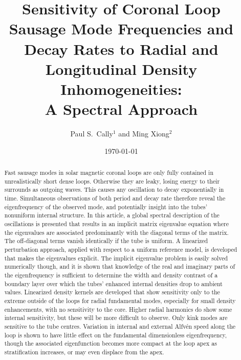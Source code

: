 \documentclass[12pt]{iopart}
\begin{document}

\title[Sensitivity of Coronal Loop Sausage Mode Frequencies]{Sensitivity of Coronal Loop Sausage Mode Frequencies and Decay Rates to Radial and Longitudinal Density Inhomogeneities:\\ A Spectral Approach}

\date{\today}


\author{Paul S.~Cally$^1$ and Ming Xiong$^2$}
\address{$^1$School of Mathematical Sciences and Monash Centre for Astrophysics,\\ Monash University, Clayton, Victoria 3800, Australia}
\address{$^2$State Key Lab of Space Weather,
National Space Science Center,\\
Chinese Academy of Sciences,
Haidian District,
Beijing, China}



\begin{abstract}\noindent
Fast sausage modes in solar magnetic coronal loops are only fully contained in unrealistically short dense loops. Otherwise they are leaky, losing energy to their surrounds as outgoing waves. This causes any oscillation to decay exponentially in time. Simultaneous observations of both period and decay rate therefore reveal the eigenfrequency of the observed mode, and potentially insight into the tubes' nonuniform internal structure. In this article, a global spectral description of the oscillations is presented that results in an implicit matrix eigenvalue equation where the eigenvalues are associated predominantly with the diagonal terms of the matrix. The off-diagonal terms vanish identically if the tube is uniform. A linearized perturbation approach, applied with respect to a uniform reference model, is developed that makes the eigenvalues explicit. The implicit eigenvalue problem is easily solved numerically though, and it is shown that knowledge of the real and imaginary parts of the eigenfrequency is sufficient to determine the width and density contrast of a boundary layer over which the tubes' enhanced internal densities drop to ambient values. Linearized density kernels are developed that show sensitivity only to the extreme outside of the loops for radial fundamental modes, especially for small density enhancements, with no sensitivity to the core. Higher radial harmonics do show some internal sensitivity, but these will be more difficult to observe. Only kink modes are sensitive to the tube centres. {Variation in internal and external Alfv\'en speed along the loop is shown to have little effect on the fundamental dimensionless eigenfrequency, though the associated eigenfunction becomes more compact at the loop apex as stratification increases, or may even displace from the apex.}
\end{abstract}
\end{document}

